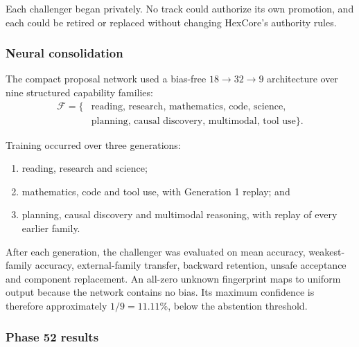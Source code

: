 Each challenger began privately.  No track could authorize its own
promotion, and each could be retired or replaced without changing HexCore's
authority rules.

\subsubsection{Neural consolidation}

The compact proposal network used a bias-free
\(18\rightarrow32\rightarrow9\) architecture over nine structured capability
families:
\[
\begin{aligned}
\mathcal{F}=\{&
\text{reading, research, mathematics, code, science,}\\
&\text{planning, causal discovery, multimodal, tool use}\}.
\end{aligned}
\]

Training occurred over three generations:
\begin{enumerate}
    \item reading, research and science;
    \item mathematics, code and tool use, with Generation 1 replay; and
    \item planning, causal discovery and multimodal reasoning, with replay of
    every earlier family.
\end{enumerate}

After each generation, the challenger was evaluated on mean accuracy,
weakest-family accuracy, external-family transfer, backward retention,
unsafe acceptance and component replacement.  An all-zero unknown
fingerprint maps to uniform output because the network contains no bias.
Its maximum confidence is therefore approximately \(1/9=11.11\%\), below
the abstention threshold.

\subsubsection{Phase 52 results}

